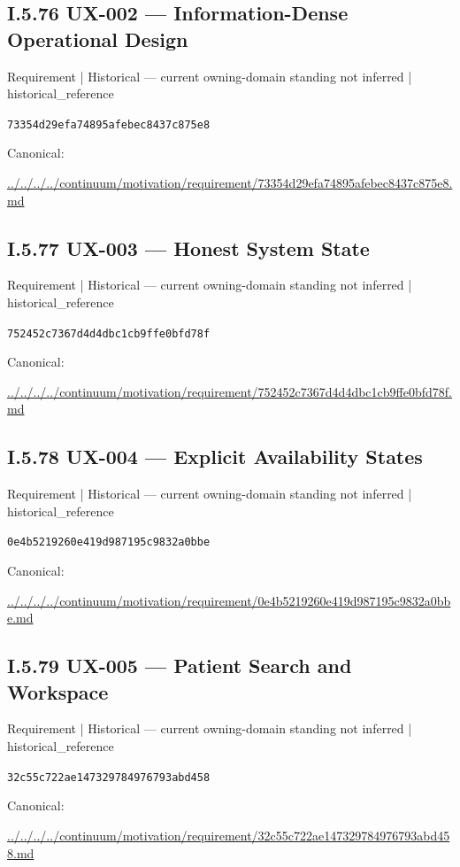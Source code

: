 \documentclass[10pt,a4paper]{article}
\begin{document}
\subsection*{I.5.76 UX-002 — Information-Dense Operational Design}
\label{element-73354d29efa74895afebec8437c875e8}
{\small Requirement | Historical — current owning-domain standing not inferred | historical\_reference}\par
\texttt{73354d29efa74895afebec8437c875e8}\par
Canonical: \par
{\footnotesize\url{../../../../continuum/motivation/requirement/73354d29efa74895afebec8437c875e8.md}}\par
\subsection*{I.5.77 UX-003 — Honest System State}
\label{element-752452c7367d4d4dbc1cb9ffe0bfd78f}
{\small Requirement | Historical — current owning-domain standing not inferred | historical\_reference}\par
\texttt{752452c7367d4d4dbc1cb9ffe0bfd78f}\par
Canonical: \par
{\footnotesize\url{../../../../continuum/motivation/requirement/752452c7367d4d4dbc1cb9ffe0bfd78f.md}}\par
\subsection*{I.5.78 UX-004 — Explicit Availability States}
\label{element-0e4b5219260e419d987195c9832a0bbe}
{\small Requirement | Historical — current owning-domain standing not inferred | historical\_reference}\par
\texttt{0e4b5219260e419d987195c9832a0bbe}\par
Canonical: \par
{\footnotesize\url{../../../../continuum/motivation/requirement/0e4b5219260e419d987195c9832a0bbe.md}}\par
\subsection*{I.5.79 UX-005 — Patient Search and Workspace}
\label{element-32c55c722ae147329784976793abd458}
{\small Requirement | Historical — current owning-domain standing not inferred | historical\_reference}\par
\texttt{32c55c722ae147329784976793abd458}\par
Canonical: \par
{\footnotesize\url{../../../../continuum/motivation/requirement/32c55c722ae147329784976793abd458.md}}\par
\end{document}
